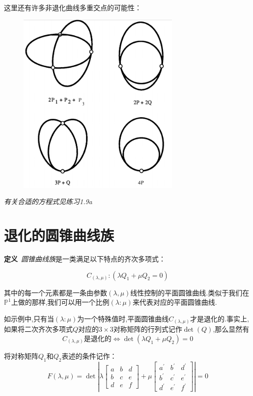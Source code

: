 \documentclass[UTF8]{book}
\begin{document}
		
		这里还有许多非退化曲线多重交点的可能性：
		\begin{figure}[H]
		  \centering
		  \includegraphics[width=8cm]{21.jpg}
		\end{figure}
	
	
		\textit{有关合适的方程式见\textit{练习1.9a}}
		
		\section{退化的圆锥曲线族}
		\textbf{定义}\ \textit{圆锥曲线族}是一类满足以下特点的齐次多项式：
		
		\begin{equation*}
		C_{(\lambda, \mu)} :\left(\lambda Q_{1}+\mu Q_{2}=0\right)
		\end{equation*}
		
		其中的每一个元素都是一条由参数$(\lambda, \mu)$线性控制的平面圆锥曲线.类似于我们在$\mathbb{P}^{1}$上做的那样,我们可以用一个比例$(\lambda : \mu)$来代表对应的平面圆锥曲线.
		
		
		如示例中,只有当$(\lambda : \mu)$为一个特殊值时,平面圆锥曲线$C_{(\lambda, \mu)}$才是退化的.事实上,如果将二次齐次多项式$Q$对应的$3 \times 3$对称矩阵的行列式记作$\operatorname{det}(Q)$,那么显然有
		\begin{equation*}
		C_{(\lambda, \mu)} \text {是退化的} \Longleftrightarrow \operatorname{det}\left(\lambda Q_{1}+\mu Q_{2}\right)=0
		\end{equation*}
		
		
		将对称矩阵$Q_{1}$和$Q_{2}$表述的条件记作：
		\begin{equation*}
		F(\lambda, \mu)=\operatorname{det}\left|\lambda\left[\begin{array}{ccc}{a} & {b} & {d} \\ {b} & {c} & {e} \\ {d} & {e} & {f}\end{array}\right]+\mu\left[\begin{array}{ccc}{a^{\prime}} & {b^{\prime}} & {d^{\prime}} \\ {b^{\prime}} & {c^{\prime}} & {e^{\prime}} \\ {d^{\prime}} & {e^{\prime}} & {f^{\prime}}\end{array}\right]\right|=0
		\end{equation*}
		
\end{document}
